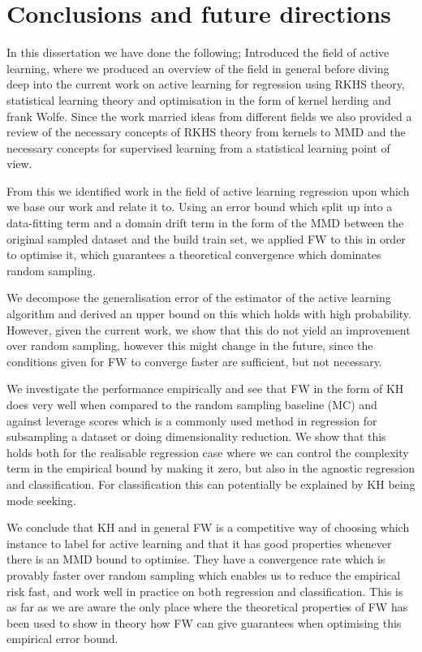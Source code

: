 \chapter{Conclusions and future directions}
\label{ch:conclusions}


In this dissertation we have done the following; Introduced the field of active
learning, where we produced an overview of the field in general before diving
deep into the current work on active learning for regression using RKHS theory,
statistical learning theory and optimisation in the form of kernel herding and
frank Wolfe. Since the work married ideas from different fields we also provided
a review of the necessary concepts of RKHS theory from kernels to MMD and the
necessary concepts for supervised learning from a statistical learning point of view.

From this we identified work in the field of active learning
regression upon which we base our work and relate it to. Using an error bound
which split up into a data-fitting term and a domain drift term in the form of
the MMD between the original sampled dataset and the build train set, we applied
FW to this in order to optimise it, which guarantees a theoretical convergence
which dominates random sampling.

We decompose the generalisation error of the estimator of the active learning
algorithm and derived an upper bound on this which holds with high probability.
However, given the current work, we show that this do not yield an improvement
over random sampling, however this might change in the future, since the
conditions given for FW to converge faster are sufficient, but not necessary.

We investigate the performance empirically and see that FW in the form of KH
does very well when compared to the random sampling baseline (MC) and against
leverage scores which is a commonly used method in regression for subsampling a
dataset or doing dimensionality reduction. We show that this holds both for the
realisable regression case where we can control the complexity term in the empirical bound
by making it zero, but also in the agnostic regression and classification. For
classification this can potentially be explained by KH being mode seeking.

We conclude that KH and in general FW is a competitive way of choosing which
instance to label for active learning and that it has good properties whenever
there is an MMD bound to optimise. They have a convergence rate which is
provably faster over random sampling which enables us to reduce the empirical
risk fast, and work well in practice on both regression and classification. This
is as far as we are aware the only place where the theoretical properties of FW
has been used to show in theory how FW can give guarantees when optimising this
empirical error bound.

